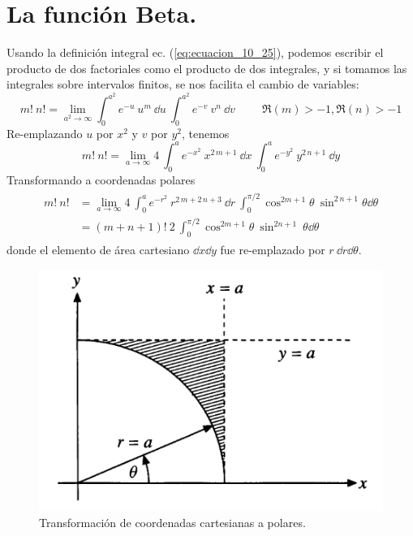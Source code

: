 \section{La función Beta.}
Usando la definición integral ec. (\ref{eq:ecuacion_10_25}), podemos escribir el producto de dos factoriales como el producto de dos integrales, y si tomamos las integrales sobre intervalos finitos, se nos facilita el cambio de variables:
\begin{equation}
m! \: n! = \lim_{a^{2} \to \infty} \int_{0}^{a^{2}} e^{-u} \: u^{m} \: \dd{u} \: \int_{0}^{a^{2}} e^{-v} \: v^{n} \: \dd{v} \hspace{1cm} \Re (m) > -1, \Re (n) > -1
\label{eq:ecuacion_10_56a}
\end{equation}
Re-emplazando $u$ por $x^{2}$ y $v$ por $y^{2}$, tenemos
\begin{equation}
m! \: n! =  \lim_{a \to \infty} 4 \: \int_{0}^{a} e^{-x^{2}} \: x ^{2 \, m+1} \: \dd{x} \: \int_{0}^{a} e^{-y^{2}} \: y^{2 \, n+1} \: \dd{y}
\label{eq:ecuacion_10_56b}
\end{equation}
Transformando a coordenadas polares
\begin{align}
\begin{aligned}
m! \: n! &= \lim_{a \to \infty} 4 \: \int_{0}^{a} e^{-r^{2}} \: r^{2 \, m + 2 \, n+3} \: \dd{r} \: \int_{0}^{\pi/2} \cos^{2m+1} \theta \: \sin^{2 \, n+1} \theta \dd{\theta} \\
&= (m + n + 1)! \: 2 \: \int_{0}^{\pi/2} \cos^{2m+1} \theta \: \sin^{2n+1} \: \theta \dd{\theta}
\label{eq:ecuacion_10_58}
\end{aligned}
\end{align}
donde el elemento de área cartesiano $\dd{x} \dd{y}$ fue re-emplazado por $r \: \dd{r} \dd{\theta}$.
\begin{figure}[H]
    \centering
    \includegraphics[scale=0.5]{Imagenes/FuncionBeta_01.png}
    \caption{Transformación de coordenadas cartesianas a polares.}
    \label{fig:figura_10_06}
\end{figure}
